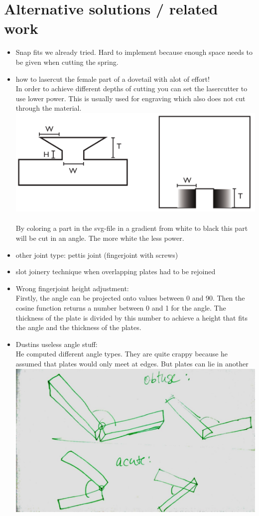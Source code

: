 \documentclass[../ClassicThesis.tex]{subfiles}
\begin{document}
    

\section{Alternative solutions / related work}
    \begin{itemize}
        \item Snap fits we already tried. Hard to implement because enough space needs to be given when cutting the spring.
        \item how to lasercut the female part of a dovetail with alot of effort!\\
        In order to achieve different depths of cutting you can set the lasercutter to use lower power. This is usually used for engraving which also does not cut through the material.\\
        \includegraphics[width=0.5\columnwidth]{Images/06-2-joints-schwalbeMitLaser.png}\\
        \\
        By coloring a part in the svg-file in a gradient from white to black this part will be cut in an angle. The more white the less power.
        \item other joint type: pettis joint (fingerjoint with screws)
        \item slot joinery technique when overlapping plates had to be rejoined
        \item Wrong fingerjoint height adjustment:\\
        Firstly, the angle can be projected onto values between 0 and 90. Then the cosine function returns a number between 0 and 1 for the angle. The thickness of the plate is divided by this number to achieve a height that fits the angle and the thickness of the plates. \\
        \item Dustins useless angle stuff:\\
        He computed different angle types. They are quite crappy because he assumed that plates would only meet at edges. But plates can lie in another\\
        \includegraphics[width=0.5\columnwidth]{Images/06-2-joints-angleTypesDustin.jpg}\\

\end{itemize}
\end{document}
